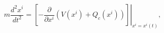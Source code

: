 \begin{equation}
m\frac{d^{2}x^{i}}{dt^{2}}=\left.  \left[  -\frac{\partial}{\partial x^{i}%
}\left(  V(x^{i})+Q_{c}(x^{i})\right)  \right]  \right|  _{x^{i}=x^{i}%
(t)},\label{33.6}%
\end{equation}

